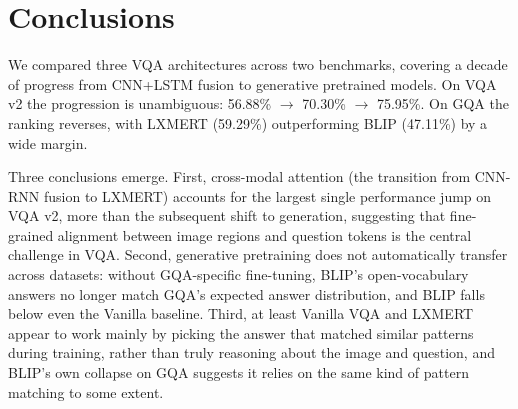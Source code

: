 \section{Conclusions}

We compared three VQA architectures across two benchmarks, covering a decade of progress from CNN+LSTM fusion to generative pretrained models. On VQA v2 the progression is unambiguous: 56.88\% $\rightarrow$ 70.30\% $\rightarrow$ 75.95\%. On GQA the ranking reverses, with LXMERT (59.29\%) outperforming BLIP (47.11\%) by a wide margin.

Three conclusions emerge. First, cross-modal attention (the transition from CNN-RNN fusion to LXMERT) accounts for the largest single performance jump on VQA v2, more than the subsequent shift to generation, suggesting that fine-grained alignment between image regions and question tokens is the central challenge in VQA. Second, generative pretraining does not automatically transfer across datasets: without GQA-specific fine-tuning, BLIP's open-vocabulary answers no longer match GQA's expected answer distribution, and BLIP falls below even the Vanilla baseline. Third, at least Vanilla VQA and LXMERT appear to work mainly by picking the answer that matched similar patterns during training, rather than truly reasoning about the image and question, and BLIP's own collapse on GQA suggests it relies on the same kind of pattern matching to some extent.
